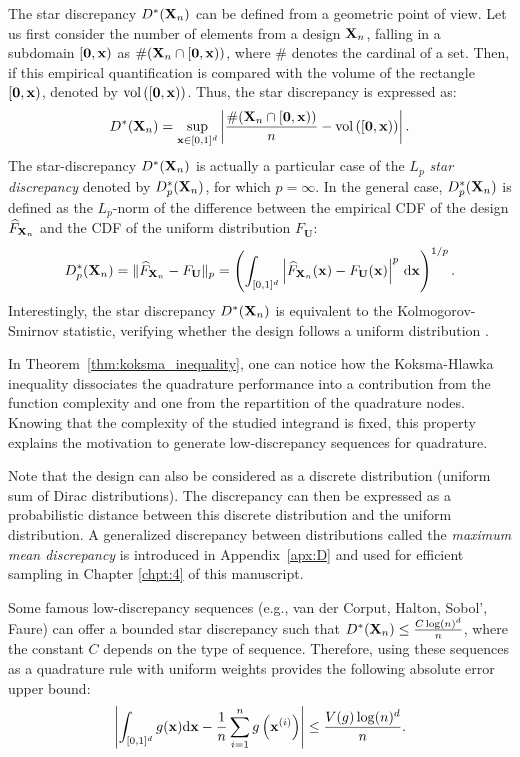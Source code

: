 The star discrepancy $D^*({\bf X}_n)$ can be defined from a geometric point of view. 
Let us first consider the number of elements from a design ${\bf X}_n$, falling in a subdomain $[\mathbf{0}, {\bf x})$ as $\#({\bf X}_n \cap [\mathbf{0}, {\bf x}))$, where $\#$ denotes the cardinal of a set. 
Then, if this empirical quantification is compared with the volume of the rectangle $[\mathbf{0}, {\bf x})$, denoted by $\mathrm{vol}\left([\mathbf{0}, {\bf x})\right)$.
Thus, the star discrepancy is expressed as:   
\begin{equation}
    D^*({\bf X}_n) = \sup_{{\bf x} \in [0, 1]^d} \left| \frac{\#({\bf X}_n \cap [\mathbf{0}, {\bf x}))}{n} - \mathrm{vol}\left([\mathbf{0}, {\bf x})\right)\right|.
\end{equation}
The star-discrepancy $D^*({\bf X}_n)$ is actually a particular case of the \textit{$L_p$ star discrepancy} denoted by $D^*_p({\bf X}_n)$, for which $p=\infty$. 
In the general case, $D^*_p({\bf X}_n)$ is defined as the $L_p$-norm of the difference between the empirical CDF of the design $\widehat{F}_{{\bf X}_n}$ and the CDF of the uniform distribution $F_{\textbf{U}}$:  
\begin{equation}
    D^*_p({\bf X}_n) = \lVert \widehat{F}_{{\bf X}_n} - F_{\textbf{U}}\rVert _p = \left(\int_{[0, 1]^d} \left\lvert\widehat{F}_{{\bf X}_n}({\bf x}) - F_{\textbf{U}}({\bf x})\right\rvert ^p \, \mathrm{d}{\bf x} \right)^{1/p}.
\end{equation}
Interestingly, the star discrepancy $D^*({\bf X}_n)$ is equivalent to the Kolmogorov-Smirnov statistic, verifying whether the design follows a uniform distribution \citep{fang_liu_2018}. 

In Theorem~\ref{thm:koksma_inequality}, one can notice how the Koksma-Hlawka inequality dissociates the quadrature performance into a contribution from the function complexity and one from the repartition of the quadrature nodes. 
Knowing that the complexity of the studied integrand is fixed, this property explains the motivation to generate low-discrepancy sequences for quadrature.  

Note that the design can also be considered as a discrete distribution (uniform sum of Dirac distributions).
The discrepancy can then be expressed as a probabilistic distance between this discrete distribution and the uniform distribution. 
A generalized discrepancy between distributions called the \textit{maximum mean discrepancy} is introduced in Appendix~\ref{apx:D} and used for efficient sampling in Chapter \ref{chpt:4} of this manuscript.

Some famous low-discrepancy sequences (e.g., van der Corput, Halton, Sobol', Faure) can offer a bounded star discrepancy such that $D^*({\bf X}_n) \leq \frac{C \log(n)^d}{n}$, where the constant $C$ depends on the type of sequence.
Therefore, using these sequences as a quadrature rule with uniform weights provides the following absolute error upper bound: 
\begin{equation}
    \left| \int_{[0, 1]^d} g({\bf x}) \mathrm{d}{\bf x} - \frac1n \sum_{i=1}^n g\left({\bf x}^{(i)}\right)\right| \leq  \frac{V(g) \log(n)^d}{n}.
\end{equation}

